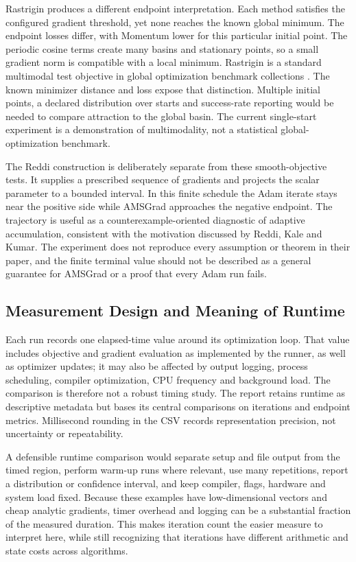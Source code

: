﻿\documentclass[conference]{IEEEtran}
\begin{document}
Rastrigin produces a different endpoint interpretation. Each method satisfies the configured gradient threshold, yet none reaches the known global minimum. The endpoint losses differ, with Momentum lower for this particular initial point. The periodic cosine terms create many basins and stationary points, so a small gradient norm is compatible with a local minimum. Rastrigin is a standard multimodal test objective in global optimization benchmark collections \cite{benchmark}. The known minimizer distance and loss expose that distinction. Multiple initial points, a declared distribution over starts and success-rate reporting would be needed to compare attraction to the global basin. The current single-start experiment is a demonstration of multimodality, not a statistical global-optimization benchmark.

The Reddi construction is deliberately separate from these smooth-objective tests. It supplies a prescribed sequence of gradients and projects the scalar parameter to a bounded interval. In this finite schedule the Adam iterate stays near the positive side while AMSGrad approaches the negative endpoint. The trajectory is useful as a counterexample-oriented diagnostic of adaptive accumulation, consistent with the motivation discussed by Reddi, Kale and Kumar. The experiment does not reproduce every assumption or theorem in their paper, and the finite terminal value should not be described as a general guarantee for AMSGrad or a proof that every Adam run fails.

\subsection{Measurement Design and Meaning of Runtime}
Each run records one elapsed-time value around its optimization loop. That value includes objective and gradient evaluation as implemented by the runner, as well as optimizer updates; it may also be affected by output logging, process scheduling, compiler optimization, CPU frequency and background load. The comparison is therefore not a robust timing study. The report retains runtime as descriptive metadata but bases its central comparisons on iterations and endpoint metrics. Millisecond rounding in the CSV records representation precision, not uncertainty or repeatability.

A defensible runtime comparison would separate setup and file output from the timed region, perform warm-up runs where relevant, use many repetitions, report a distribution or confidence interval, and keep compiler, flags, hardware and system load fixed. Because these examples have low-dimensional vectors and cheap analytic gradients, timer overhead and logging can be a substantial fraction of the measured duration. This makes iteration count the easier measure to interpret here, while still recognizing that iterations have different arithmetic and state costs across algorithms.
\end{document}
